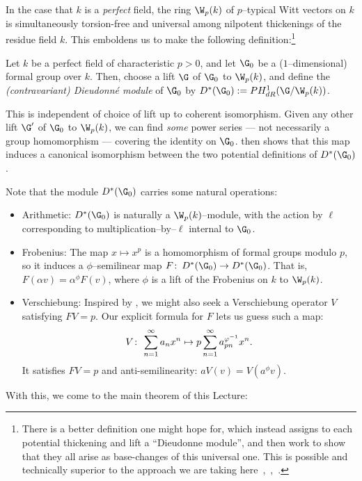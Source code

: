 In the case that $k$ is a \emph{perfect} field, the ring $\W_p(k)$ of $p$--typical Witt vectors on $k$ is simultaneously torsion-free and universal among nilpotent thickenings of the residue field $k$.  This emboldens us to make the following definition:\footnote{There is a better definition one might hope for, which instead assigns to each potential thickening and lift a ``Dieudonne module'', and then work to show that they all arise as base-changes of this universal one.  This is possible and technically superior to the approach we are taking here~\cite[Theorem 5.1.6]{Katz},~\cite[Chapter 4]{Messing},~\cite{Grothendieck}.}

\begin{definition}{\cite[Section 5.5]{Katz}}
Let $k$ be a perfect field of characteristic $p > 0$, and let $\G_0$ be a ($1$--dimensional) formal group over $k$.  Then, choose a lift $\G$ of $\G_0$ to $\W_p(k)$, and define the \textit{(contravariant) Dieudonn\'e module} of $\G_0$ by $D^*(\G_0) := PH^1_{dR}(\G / \W_p(k))$.
\end{definition}

\begin{remark}
This is independent of choice of lift up to coherent isomorphism.  Given any other lift $\G'$ of $\G_0$ to $\W_p(k)$, we can find \emph{some} power series --- not necessarily a group homomorphism --- covering the identity on $\G_0$.   then shows that this map induces a canonical isomorphism between the two potential definitions of $D^*(\G_0)$.
\end{remark}

Note that the module $D^*(\G_0)$ carries some natural operations:
\begin{itemize}
\item Arithmetic: $D^*(\G_0)$ is naturally a $\W_p(k)$--module, with the action by $\ell$ corresponding to multiplication--by--$\ell$ internal to $\G_0$.
\item Frobenius: The map $x \mapsto x^p$ is a homomorphism of formal groups modulo $p$, so it induces a $\phi$--semilinear map $F\co D^*(\G_0) \to D^*(\G_0)$.  That is, $F(\alpha v) = \alpha^\phi F(v)$, where $\phi$ is a lift of the Frobenius on $k$ to $\W_p(k)$.
\item Verschiebung: Inspired by , we might also seek a Verschiebung operator $V$ satisfying $FV = p$.  Our explicit formula for $F$ lets us guess such a map: \[V\colon\thinspace \sum_{n=1}^\infty a_n x^n \mapsto p \sum_{n=1}^\infty a_{pn}^{\varphi^{-1}} x^n.\]  It satisfies $FV = p$ and anti-semilinearity: $aV(v) = V(a^\phi v)$.
\end{itemize}
With this, we come to the main theorem of this Lecture:

